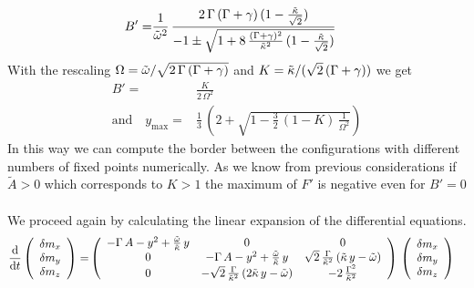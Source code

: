 \documentclass{article}
\begin{document}
\begin{align*}
    B'=&\frac{1}{\tilde{\omega}^2}\,\frac{2\,\Gamma\,(\Gamma+\gamma)\,(1-\frac{\tilde{\kappa}}{\sqrt{2}})}{-1\pm\sqrt{1+8\,\frac{(\Gamma+\gamma)^2}{\tilde{\kappa}^2}\,(1-\frac{\tilde{\kappa}}{\sqrt{2}})}}
\end{align*}
With the rescaling $\Omega=\tilde{\omega}/\sqrt{2\,\Gamma\,(\Gamma+\gamma)}$ and $K=\tilde{\kappa}/(\sqrt{2}\,(\Gamma+\gamma))$ we get
\begin{align*}
    B'=&\frac{K}{2\,\Omega^2}\\
    \text{and}\quad y_\text{max}=&\frac{1}{3}\,\left( 2+ \sqrt{1-\frac{3}{2}\,(1-K)\,\frac{1}{\Omega^2}}  \right)
\end{align*}
In this way we can compute the border between the configurations with different numbers of fixed points numerically. As we know from previous considerations if $\tilde{A}>0$ which corresponds to $K>1$ the maximum of $F'$ is negative even for $B'=0$\\\\
We proceed again by calculating the linear expansion of the differential equations.
\begin{align*}
    \frac{\text{d}}{\text{d}t}\left(\begin{array}{c}
         \delta m_x\\
         \delta m_y\\
         \delta m_z
    \end{array}\right)=&\left( \begin{array}{ccc}
        -\Gamma\,A-y^2+\frac{\tilde{\omega}}{\tilde{\kappa}}\,y&  0 & 0\\
        0 & -\Gamma\,A-y^2+\frac{\tilde{\omega}}{\tilde{\kappa}}\,y & \sqrt{2}\,\frac{\Gamma}{\tilde{\kappa}^2}\,(\tilde{\kappa}\,y-\tilde{\omega})\\
        0 &  -\sqrt{2}\,\frac{\Gamma}{\tilde{\kappa}^2}\,(2\tilde{\kappa}\,y-\tilde{\omega}) & -2\,\frac{\Gamma^2}{\tilde{\kappa}^2}
    \end{array} \right)\,\left(\begin{array}{c}
         \delta m_x\\
         \delta m_y\\
         \delta m_z
    \end{array}\right)
\end{align*}
\end{document}
